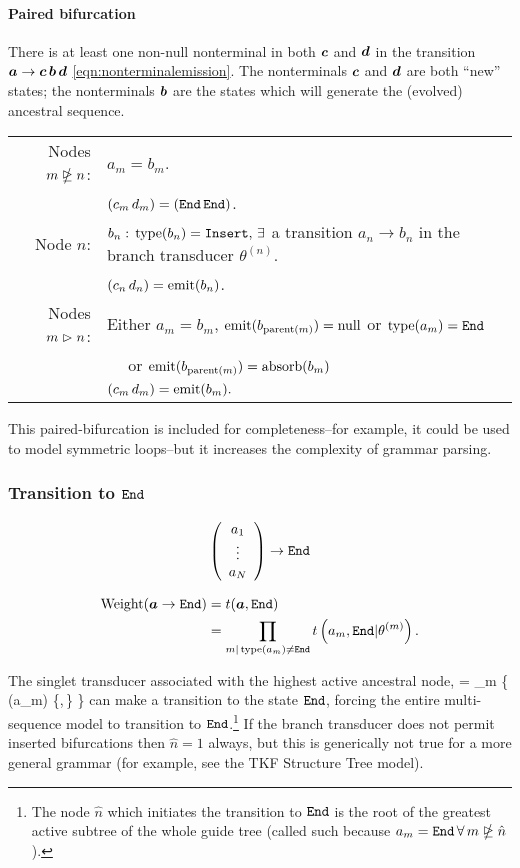 \documentclass[10pt]{article}
\begin{document}
\paragraph{Paired bifurcation}
There is at least one non-null nonterminal in both $\bvec{c}$ and $\bvec{d}$ in the transition $\bvec{a} \to \bvec{c}\,\bvec{b}\,\bvec{d}$ \eqref{eqn:nonterminalemission}.
The nonterminals $\bvec{c}$ and $\bvec{d}$ are both ``new'' states;
the nonterminals $\bvec{b}$ are the states which will generate the (evolved) ancestral sequence.

\begin{tabular}{rl}
  Nodes $\mNDEn$: & $a_m = b_m$. \\
  & $(c_m\,d_m) = (\Send\,\Send)$. \\
  Node $n$: & $b_n:\,\type(b_n) = \Sinsert,\,\exists$ a transition $a_n \to b_n$ in the branch transducer $\theta^{(n)}$. \\
  & $(c_n\,d_n) = \emit(b_n)$. \\
  Nodes $\mDn$: & Either $a_m = b_m$, $\emit(b_{\parent(m)}) = \Tnull$ or $\type(a_m) = \Send$ \\
  & $\quad$ or $\emit(b_{\parent(m)}) = \absorb(b_m)$ \\
  & $(c_m\,d_m) = \emit(b_m) . $
\end{tabular}

This paired-bifurcation is included for completeness--for example, it could be used to model symmetric loops--but it
increases the complexity of grammar parsing.



\subsubsection*{Transition to $\Send$}
\[ \statevec{a} \to \Send \]

\begin{align} \label{eqn:transtoend}
  \weight(\bvec{a}\to\Send) &=  t(\bvec{a},\Send) \\
  &= \prod_{m|\type(a_m)\ne\Send} \transweight{m}{a_m}{\Send} .
\end{align}

The singlet transducer associated with the highest active ancestral node,
\beqn
{} = \argmin_m \left\{ \type(a_m) \in \{\Sstart,\,\Sinsert\} \right\}
\eeqn
can make a transition to the state $\Send$,
forcing the entire multi-sequence model to transition to $\Send$.\footnote{The node $\hat{n}$ which initiates the transition to $\Send$ 
is the root of the greatest active subtree of the whole guide tree (called such because $a_m = \Send \, \forall \, m \ntrianglerighteq \hat{n}$).}
If the branch transducer does not permit inserted bifurcations then $\hat{n} = 1$ always,
but this is generically not true for a more general grammar
(for example, see the TKF Structure Tree model).
\end{document}

